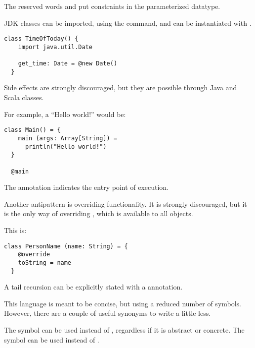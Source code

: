 The reserved words \sodasubtype and \sodasupertype put constraints in the parameterized datatype.

JDK classes can be imported, using the \sodaimport command, and can be instantiated with \sodanew.

\begin{lstlisting}[label={lst:exampleJDKImport}]
  class TimeOfToday() {
    import java.util.Date

    get_time: Date = @new Date()
  }
\end{lstlisting}

Side effects are strongly discouraged, but they are possible through Java and Scala classes.

For example, a ``Hello world!'' would be:
\begin{lstlisting}[label={lst:exampleHelloWorld}]
  class Main() = {
    main (args: Array[String]) =
      println("Hello world!")
  }

  @main
\end{lstlisting}

The \sodamain annotation indicates the entry point of execution.

Another antipattern is overriding functionality.
It is strongly discouraged, but it is the only way of overriding , which is available to all objects.

This is:
\begin{lstlisting}[label={lst:exampleToString}]
  class PersonName (name: String) = {
    @override
    toString = name
  }
\end{lstlisting}

A tail recursion can be explicitly stated with a \sodatailrec annotation.

This language is meant to be concise, but using a reduced number of symbols.
However, there are a couple of useful synonyms to write a little less.

The symbol \sodaasterisk can be used instead of \sodaclass, regardless if it is abstract or concrete.
The symbol \sodaplus can be used instead of \sodaimport.

